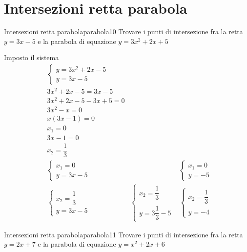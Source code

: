 \section{Intersezioni retta parabola}
\begin{esempiot}{Intersezioni retta parabola}{parabola10}
	Trovare i punti di intersezione fra la retta $y=3x-5$ e la parabola di equazione $y=3x^2+2x+5$
\end{esempiot}
Imposto il sistema
\begin{align*}
&\begin{cases}
y=3x^2+2x-5\\
y=3x-5
\end{cases}\\
&3x^2+2x-5=3x-5\\
&3x^2+2x-5-3x+5=0\\
&3x^2-x=0\\
&x(3x-1)=0\\
&x_1=0\\
&3x-1=0\\
&x_2=\dfrac{1}{3}\\
&\begin{cases}
x_1=0\\
y=3x-5
\end{cases}
&&\begin{cases}
x_1=0\\
y=-5
\end{cases}\\
&\begin{cases}
x_2=\dfrac{1}{3}\\
y=3x-5
\end{cases}
&\begin{cases}
x_2=\dfrac{1}{3}\\
\\
y=3\dfrac{1}{3}-5
\end{cases}
&\begin{cases}
x_2=\dfrac{1}{3}\\
\\
y=-4
\end{cases}
\end{align*}
%	
\begin{esempiot}{Intersezioni retta parabola}{parabola11}
	Trovare i punti di intersezione fra la retta $y=2x+7$ e la parabola di equazione $y=x^2+2x+6$
\end{esempiot}
